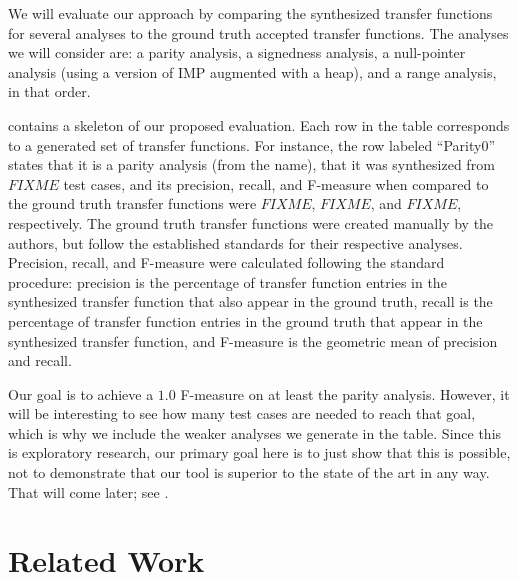 \documentclass[10pt,conference]{IEEEtran}
\begin{document}
We will evaluate our approach by comparing the synthesized transfer
functions for several analyses to the ground truth accepted transfer
functions. The analyses we will consider are: a parity analysis,
a signedness analysis, a null-pointer analysis (using a version of
IMP augmented with a heap), and a range analysis, in that order.

 contains a skeleton of our proposed evaluation.
Each row in the table corresponds to a generated set of transfer functions.
For instance,
the row labeled ``Parity0'' states that it is a parity analysis
(from the name), that it was synthesized from $FIXME$ test cases,
and its precision, recall, and F-measure when compared to the ground
truth transfer functions were $FIXME$, $FIXME$, and $FIXME$, respectively.
The ground truth transfer functions were created manually by the authors,
but follow the established standards for their respective analyses.
Precision, recall, and F-measure were calculated following the standard
procedure: precision is the percentage of transfer function entries
in the synthesized transfer function that also appear in the ground truth,
recall is the percentage of transfer function entries in the ground truth
that appear in the synthesized transfer function, and F-measure is the
geometric mean of precision and recall.

Our goal is to achieve a $1.0$ F-measure on at least the parity analysis.
However, it will be interesting to see how many test cases are needed to
reach that goal, which is why we include the weaker analyses we generate
in the table. Since this is exploratory research, our primary goal here
is to just show that this is possible, not to demonstrate that our tool
is superior to the state of the art in any way. That will come later;
see .

\section{Related Work}
\end{document}
